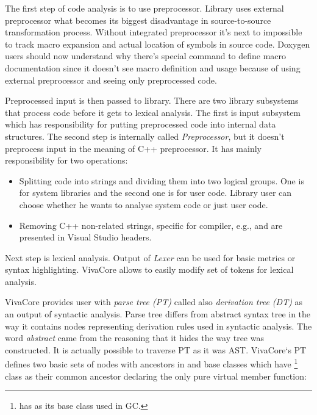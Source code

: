 The first step of code analysis is to use preprocessor. Library uses external preprocessor what becomes its biggest disadvantage in source-to-source transformation process. Without integrated preprocessor it's next to impossible to track macro expansion and actual location of symbols in source code. Doxygen users should now understand why there's special  command to define macro documentation since it doesn't see macro definition and usage because of using external preprocessor and seeing only preprocessed code.

Preprocessed input is then passed to library. There are two library subsystems that process code before it gets to lexical analysis. The first is input subsystem which has responsibility for putting preprocessed code into internal data structures. The second step is internally called \emph{Preprocessor}, but it doesn't preprocess input in the meaning of C++ preprocessor. It has mainly responsibility for two operations:

\begin{itemize}
\item Splitting code into strings and dividing them into two logical groups. One is for system libraries and the second one is for user code. Library user can choose whether he wants to analyse system code or just user code.
\item Removing C++ non-related strings, specific for compiler, e.g.,  and  are presented in Visual Studio headers.
\end{itemize}

Next step is lexical analysis. Output of \emph{Lexer} can be used for basic metrics or syntax highlighting. VivaCore allows to easily modify set of tokens for lexical analysis.

VivaCore provides user with \emph{parse tree (PT)} called also \emph{derivation tree (DT)} as an output of syntactic analysis. Parse tree differs from abstract syntax tree in the way it contains nodes representing derivation rules used in syntactic analysis. The word \emph{abstract} came from the reasoning that it hides the way tree was constructed. It is actually possible to traverse PT as it was AST. VivaCore`s PT defines two basic sets of nodes with ancestors in  and  base classes which have \footnote{ has  as its base class used in GC.} class as their common ancestor declaring the only pure virtual member function:

